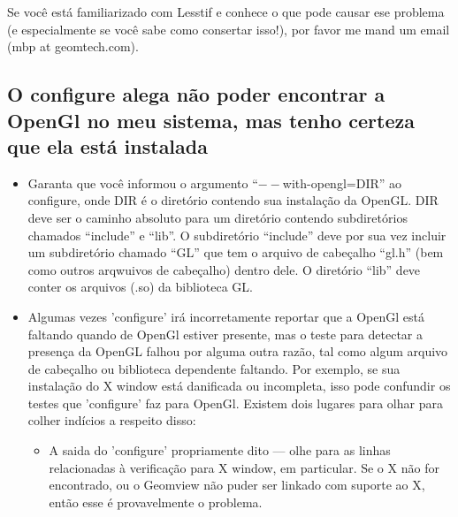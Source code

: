 \documentclass[12pt,a4paper]{article}
\begin{document}
        Se voc\^e est\'a familiarizado com Lesstif e conhece o que pode causar ese problema
        (e especialmente se voc\^e sabe como consertar isso!), por favor me mand um email
        (mbp at geomtech.com).

    \subsection{O configure alega n\~ao poder encontrar a OpenGl no meu sistema, mas tenho certeza que ela est\'a instalada}
    \label{aswer:OpenGl}
        \begin{itemize}
          \item Garanta que voc\^e informou o argumento ``$--$with-opengl=DIR'' ao configure,
            onde DIR \'e o diret\'{o}rio contendo sua instala\c{c}\~ao da OpenGL. DIR
            deve ser o caminho absoluto para um diret\'{o}rio contendo subdiret\'{o}rios
            chamados ``include'' e ``lib''. O subdiret\'{o}rio ``include'' deve por sua vez
            incluir um subdiret\'{o}rio chamado ``GL'' que tem o arquivo de cabe\c{c}alho ``gl.h'' (bem
            como outros arqwuivos de cabe\c{c}alho) dentro dele. O diret\'{o}rio ``lib'' deve
            conter os arquivos (.so) da biblioteca GL.

          \item Algumas vezes 'configure' ir\'a incorretamente reportar que a OpenGl est\'a faltando
            quando de OpenGl estiver presente, mas o teste para detectar a presen\c{c}a da OpenGL falhou por alguma
            outra raz\~ao, tal como algum arquivo de cabe\c{c}alho ou biblioteca dependente faltando.
            Por exemplo, se sua instala\c{c}\~ao do X window est\'a danificada ou
            incompleta, isso pode confundir os testes que 'configure' faz para
            OpenGl. Existem dois lugares para olhar para colher ind\'icios a respeito disso:
              \begin{itemize}
              \item A saida do 'configure' propriamente dito --- olhe para as linhas relacionadas
                \`a verifica\c{c}\~ao para X window, em particular. Se o X n\~ao for encontrado, ou
                o Geomview n\~ao puder ser linkado com suporte ao X, ent\~ao esse \'e provavelmente o problema.


\end{itemize}
\end{itemize}
\end{document}
